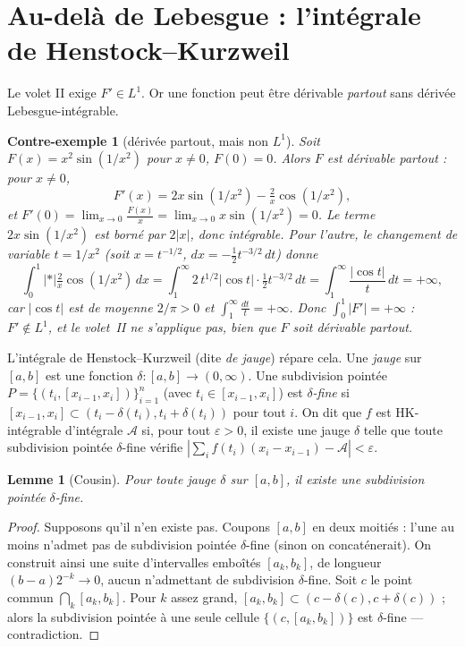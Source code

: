 \documentclass[11pt]{article}
\theoremstyle{thmblue}
\newtheorem{lemme}[theoreme]{Lemme}
\theoremstyle{defplain}
\newtheorem{contreexemple}[theoreme]{Contre-exemple}
\theoremstyle{rem}
\newcommand{\dx}{\,dx}
\newcommand{\dt}{\,dt}
\newcommand{\abs}[1]{\left\lvert #1 \right\rvert}
\newcommand{\eps}{\varepsilon}
\begin{document}
\section{Au-delà de Lebesgue : l'intégrale de Henstock--Kurzweil}

Le volet II exige $F'\in L^1$. Or une fonction peut être dérivable \emph{partout} sans dérivée
Lebesgue-intégrable.

\begin{contreexemple}[dérivée partout, mais non $L^1$]\label{ce:hk}
Soit $F(x)=x^2\sin(1/x^2)$ pour $x\neq0$, $F(0)=0$. Alors $F$ est dérivable partout : pour $x\neq0$,
\[
F'(x)=2x\sin(1/x^2)-\tfrac{2}{x}\cos(1/x^2),
\]
et $F'(0)=\lim_{x\to0}\tfrac{F(x)}{x}=\lim_{x\to0}x\sin(1/x^2)=0$. Le terme $2x\sin(1/x^2)$ est borné
par $2\abs x$, donc intégrable. Pour l'autre, le changement de variable $t=1/x^2$ (soit
$x=t^{-1/2}$, $dx=-\tfrac12 t^{-3/2}\dt$) donne
\[
\int_0^1\abs*{\tfrac{2}{x}\cos(1/x^2)}\dx=\int_1^{\infty}2\,t^{1/2}\abs{\cos t}\cdot\tfrac12 t^{-3/2}\dt
=\int_1^{\infty}\frac{\abs{\cos t}}{t}\dt=+\infty,
\]
car $\abs{\cos t}$ est de moyenne $2/\pi>0$ et $\int_1^\infty \tfrac{dt}{t}=+\infty$. Donc
$\int_0^1\abs{F'}=+\infty$ : $F'\notin L^1$, et le volet~II ne s'applique pas, bien que $F$ soit
dérivable partout.
\end{contreexemple}

L'intégrale de Henstock--Kurzweil (dite \emph{de jauge}) répare cela. Une \emph{jauge} sur $[a,b]$ est
une fonction $\delta:[a,b]\to(0,\infty)$. Une subdivision pointée $P=\{(t_i,[x_{i-1},x_i])\}_{i=1}^n$
(avec $t_i\in[x_{i-1},x_i]$) est \emph{$\delta$-fine} si $[x_{i-1},x_i]\subset(t_i-\delta(t_i),t_i+\delta(t_i))$
pour tout $i$. On dit que $f$ est HK-intégrable d'intégrale $\mathcal A$ si, pour tout $\eps>0$, il
existe une jauge $\delta$ telle que toute subdivision pointée $\delta$-fine vérifie
$\abs{\sum_i f(t_i)(x_i-x_{i-1})-\mathcal A}<\eps$.

\begin{lemme}[Cousin]\label{lem:cousin}
Pour toute jauge $\delta$ sur $[a,b]$, il existe une subdivision pointée $\delta$-fine.
\end{lemme}

\begin{proof}
Supposons qu'il n'en existe pas. Coupons $[a,b]$ en deux moitiés : l'une au moins n'admet pas de
subdivision pointée $\delta$-fine (sinon on concaténerait). On construit ainsi une suite d'intervalles
emboîtés $[a_k,b_k]$, de longueur $(b-a)2^{-k}\to0$, aucun n'admettant de subdivision $\delta$-fine.
Soit $c$ le point commun $\bigcap_k[a_k,b_k]$. Pour $k$ assez grand,
$[a_k,b_k]\subset(c-\delta(c),c+\delta(c))$ ; alors la subdivision pointée à une seule cellule
$\{(c,[a_k,b_k])\}$ est $\delta$-fine --- contradiction.
\end{proof}
\end{document}
